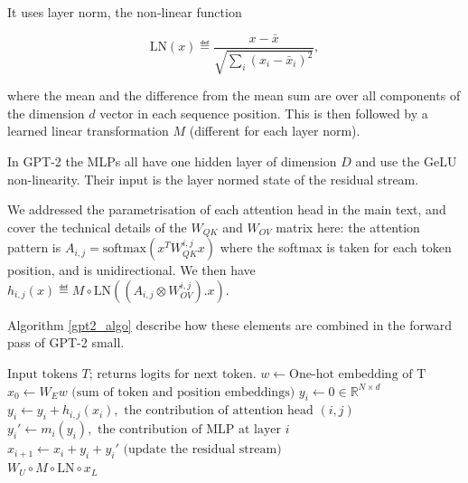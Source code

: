 It uses layer norm, the non-linear function

\begin{equation}
\text{LN}(x) \eqdef \frac{x-\bar{x}}{\sqrt{\sum_i (x_i - \bar{x}_i )^2}},
\label{eqn:layer_norm_definition}
\end{equation}

where the mean and the difference from the mean sum are over all components of the dimension $d$ vector in each sequence position. This is then followed by a learned linear transformation $M$ (different for each layer norm).

In GPT-2 the MLPs all have one hidden layer of dimension $D$ and use the $\text{GeLU}$ non-linearity. Their input is the layer normed state of the residual stream.

We addressed the parametrisation of each attention head in the main text, and cover the technical details of the $W_{QK}$ and $W_{OV}$ matrix here: the attention pattern is $A_{i, j} = \text{softmax}( x^T W_{QK}^{i, j} x )$ where the softmax is taken for each token position, and is unidirectional. We then have $h_{i, j}(x) \eqdef M \circ \text{LN} ( (A_{i, j} \otimes W_{OV}^{i, j}) . x)$. 

Algorithm \ref{gpt2_algo} describe how these elements are combined in the forward pass of GPT-2 small.

\begin{algorithm}
\caption{GPT-2.}\label{gpt2_algo}
\begin{algorithmic}[1]
\Require $\text{Input tokens $T$; returns logits for next token.}$
\State $w \gets \text{One-hot embedding of T}$
\State $x_0 \gets W_E w \text{ (sum of token and position embeddings)} $
    \State $y_i \gets 0 \in \mathbb{R}^{N \times d}$
        \State $y_i \gets y_i + h_{i, j}(x_i), \text{ the contribution of attention head $(i, j)$}$
    \EndFor
    \State $y_i' \gets m_i(y_i), \text{ the contribution of MLP at layer $i$}$ 
    \State $x_{i+1} \gets x_i + y_i + y_i' \text{ (update the residual stream)}$ 
\EndFor \\
\Return $W_U \circ M \circ \text{LN} \circ x_{L}$
\end{algorithmic}
\end{algorithm}



